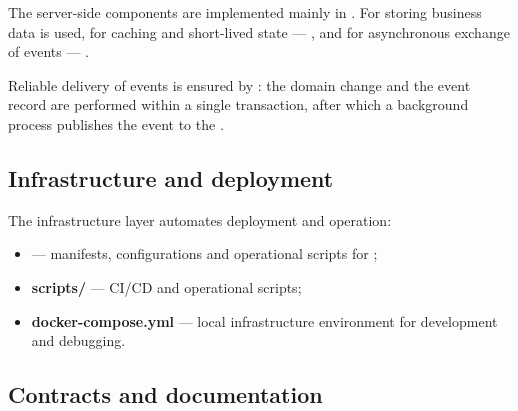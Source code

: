\documentclass[12pt,a4paper]{extarticle}
\begin{document}
\begin{hseExample}
The server-side components are implemented mainly in . For storing business data  is used, for caching and short-lived state --- , and for asynchronous exchange of events --- .

Reliable delivery of events is ensured by : the domain change and the event record are performed within a single transaction, after which a background process publishes the event to the .
\end{hseExample}

\subsection{Infrastructure and deployment}

\begin{hseExample}
The infrastructure layer automates deployment and operation:

\begin{itemize}[leftmargin=1.25cm]
    \item \textbf{} --- manifests, configurations and operational scripts for ;
    \item \textbf{scripts/} --- CI/CD and operational scripts;
    \item \textbf{docker-compose.yml} --- local infrastructure environment for development and debugging.
\end{itemize}
\end{hseExample}

\subsection{Contracts and documentation}
\end{document}
